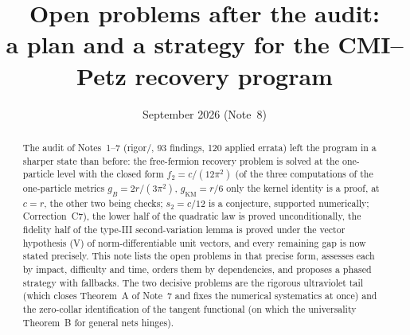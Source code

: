 \documentclass[11pt]{article}
\title{\color{navy}\bfseries Open problems after the audit:\\[2pt]
\large a plan and a strategy for the CMI--Petz recovery program}
\author{}
\date{September 2026 (Note~8)}
\theoremstyle{accent}
\theoremstyle{definition}
\begin{document}
\maketitle
\vspace{-1.55em}

\begin{abstract}
The audit of Notes~1--7 (rigor/, 93 findings, 120 applied errata) left the program in a sharper state than before: the free-fermion recovery problem is solved at the one-particle level with the closed form \(f_2=c/(12\pi^2)\) (of the three computations of the one-particle metrics \(g_B=2r/(3\pi^2)\), \(g_{\mathrm{KM}}=r/6\) only the kernel identity is a proof, at \(c=r\), the other two being checks; \(s_2=c/12\) is a conjecture, supported numerically; Correction~C7), the lower half of the quadratic law is proved unconditionally, the fidelity half of the type-III second-variation lemma is proved under the vector hypothesis (V) of norm-differentiable unit vectors, and every remaining gap is now stated precisely.  This note lists the open problems in that precise form, assesses each by impact, difficulty and time, orders them by dependencies, and proposes a phased strategy with fallbacks.  The two decisive problems are the rigorous ultraviolet tail (which closes Theorem~A of Note~7 and fixes the numerical systematics at once) and the zero-collar identification of the tangent functional (on which the universality Theorem~B for general nets hinges).
\end{abstract}
\end{document}

